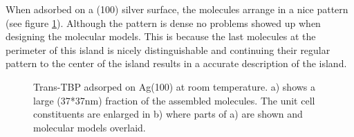 When adsorbed on a (100) silver surface, the molecules arrange in a nice pattern (see figure \ref{fig:two-leg-trans-ag100-motiv}). Although the pattern is dense no problems showed up when designing the molecular models. This is because the last molecules at the perimeter of this island is nicely distinguishable and continuing their regular pattern to the center of the island results in a accurate description of the island.

\begin{figure}[h]
 \centering
  \qquad %
\caption{Trans-TBP adsorped on Ag(100) at room temperature. a) shows a large (37*37nm) fraction of the assembled molecules. The unit cell constituents are enlarged in b) where parts of a) are shown and molecular models overlaid.}
\label{fig:two-leg-trans-ag100-motiv}
\end{figure}